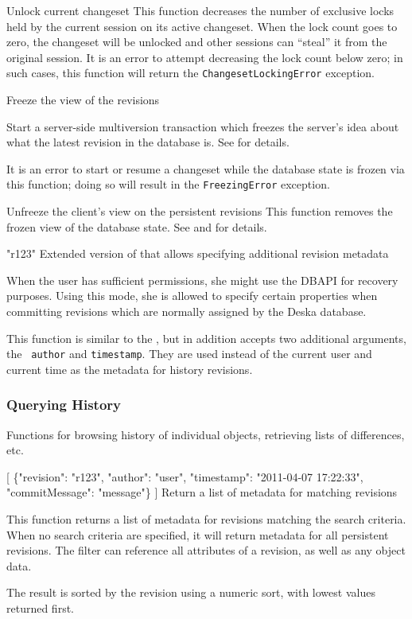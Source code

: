 \documentclass[deska]{subfiles}
\begin{document}
    {Unlock current changeset}
    {This function decreases the number of exclusive locks held by the current session on its active changeset.  When
    the lock count goes to zero, the changeset will be unlocked and other sessions can ``steal'' it from the original
    session. It is an error to attempt decreasing the lock count below zero; in such cases, this function will return
    the {\tt ChangesetLockingError} exception.}

    {Freeze the view of the revisions}
    {Start a server-side multiversion transaction which freezes the server's idea about what the latest revision in the
    database is. See  for details.

    It is an error to start or resume a changeset while the database state is frozen via this function; doing so will
    result in the {\tt FreezingError} exception.}

    {Unfreeze the client's view on the persistent revisions}
    {This function removes the frozen view of the database state.  See  and
     for details.}

    {"r123"}
    {Extended version of  that allows specifying additional revision metadata}
    {When the user has sufficient permissions, she might use the DBAPI for recovery purposes.  Using this mode, she is
    allowed to specify certain properties when committing revisions which are normally assigned by the Deska database.

    This function is similar to the , but in addition accepts two additional arguments, the {\tt
    author} and {\tt timestamp}.  They are used instead of the current user and current time as the metadata for history
    revisions.}

\subsubsection{Querying History}
\label{sec:api-group-history}

Functions for browsing history of individual objects, retrieving lists of differences, etc.

    {[
    \{"revision": "r123", "author": "user", "timestamp": "2011-04-07 17:22:33", "commitMessage": "message"\}
    ]}
    {Return a list of metadata for matching revisions}
    {This function returns a list of metadata for revisions matching the search criteria.  When no search criteria are
    specified, it will return metadata for all persistent revisions.  The filter can reference all attributes of a
    revision, as well as any object data.

    The result is sorted by the revision using a numeric sort, with lowest values returned first.}
\end{document}
